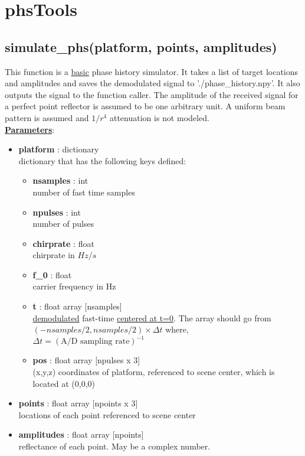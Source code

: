 \documentclass{article}
\newcommand{\defs}[2]{\textbf{{#1}} : {#2}}
\begin{document}
\section{phsTools}


\subsection{simulate\_phs(platform, points, amplitudes)}
\label{simulate_phs}
This function is a \underline{basic} phase history simulator.  It takes a list of target locations and amplitudes and saves the demodulated signal to './phase\_history.npy'.  It also outputs the signal to the function caller.  The amplitude of the received signal for a perfect point reflector is assumed to be one arbitrary unit.  A uniform beam pattern is assumed and $1/r^4$ attenuation is not modeled.\\

\noindent \underline{\textbf{Parameters}}:

\begin{itemize}
  \item \defs{platform}{dictionary}\\
  	dictionary that has the following keys defined:
  \begin{itemize}
    \item \defs{nsamples}{int}\\
    	number of fast time samples
    \item \defs{npulses}{int}\\
    	number of pulses
    \item \defs{chirprate}{float}\\
    	chirprate in $Hz/s$
    \item \defs{f\_0}{float}\\
    	carrier frequency in Hz
    \item \defs{t}{float array [nsamples]}\\
    	\underline{demodulated} fast-time \underline{centered at t=0}.  The array should go from $(-nsamples/2, nsamples/2)\times\Delta t$ where, $\Delta t = (\mbox{A/D sampling rate})^{-1}$
    \item \defs{pos}{float array [npulses x 3]}\\
       	(x,y,z) coordinates of platform, referenced to scene center, which is located at (0,0,0)
  \end{itemize}
  \item \defs{points}{float array [npoints x 3]}\\
  	locations of each point referenced to scene center
  \item \defs{amplitudes}{float array [npoints]}\\
  	reflectance of each point.  May be a complex number.
\end{itemize}
\end{document}
